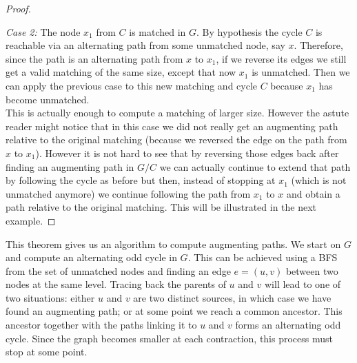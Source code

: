 \documentclass[a4paper,10pt]{article}
\begin{document}
\begin{proof}
\begin{center}
\end{center}

\emph{Case 2:} The node $x_1$ from $C$ is matched in $G$. By hypothesis the cycle
$C$ is reachable via an alternating path from some unmatched node, say $x$. Therefore, since
the path is an alternating path from $x$ to $x_1$, if we reverse its edges we still get a valid matching
of the same size, except that now $x_1$ is unmatched. Then we can apply the previous case
to this new matching and cycle $C$ because $x_1$ has become
unmatched. \\

This is actually enough to compute a matching of larger size. However the astute reader
might notice that in this case we did not really get an augmenting path relative
to the original matching (because we reversed the edge on the path from $x$ to $x_1$).
However it is not hard to see that by reversing those edges back after finding an augmenting path
in $G \slash C$ we can actually continue to extend that path by following the cycle as 
before but then, instead of stopping at $x_1$ (which is not unmatched anymore)
we continue following the path from $x_1$ to $x$ and obtain a path relative to the
original matching. This will be illustrated in the next example.

\end{proof}

This theorem gives us an algorithm to compute augmenting paths. We start on $G$ and 
compute an alternating odd cycle in $G$. This can be achieved using a \textsf{BFS}
from the set of unmatched nodes and finding an edge $e = (u, v)$ between two nodes at the same level.
Tracing back the parents of $u$ and $v$ will lead to one of two situations: either $u$ and $v$ are 
two distinct sources, in which case we have found an augmenting path; or at some point we reach a common
ancestor. This ancestor together with the paths linking it to $u$ and $v$ forms an alternating odd cycle.
Since the graph becomes smaller at each contraction, this process must stop at some point.
\end{document}
